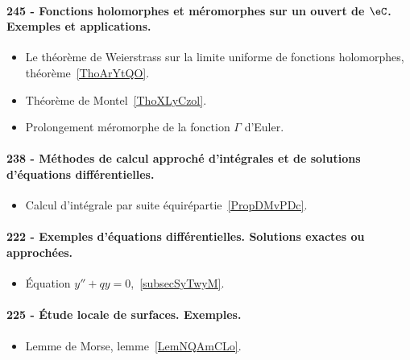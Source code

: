\paragraph{245 - Fonctions holomorphes et méromorphes sur un ouvert de \( \eC\). Exemples et applications.}
\begin{itemize}
	\item Le théorème de Weierstrass sur la limite uniforme de fonctions holomorphes, théorème~\ref{ThoArYtQO}.
	\item Théorème de Montel~\ref{ThoXLyCzol}.
	\item Prolongement méromorphe de la fonction \( \Gamma\) d'Euler.
\end{itemize}
\paragraph{238 - Méthodes de calcul approché d'intégrales et de solutions d’équations différentielles.}
\begin{itemize}
	\item Calcul d'intégrale par suite équirépartie~\ref{PropDMvPDc}.
\end{itemize}
\paragraph{222 - Exemples d’équations différentielles. Solutions exactes ou approchées.}
\begin{itemize}
	\item Équation \( y''+qy=0\),~\ref{subsecSyTwyM}.
\end{itemize}
\paragraph{225 - Étude locale de surfaces. Exemples.}
\begin{itemize}
	\item Lemme de Morse, lemme~\ref{LemNQAmCLo}.
\end{itemize}
